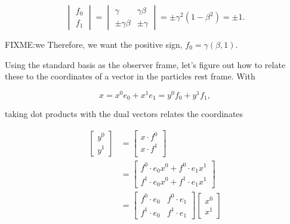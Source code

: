 \begin{equation}\label{eqn:grahamSchmidtLorentz:685}
\begin{vmatrix}
f_0 \\
f_1
\end{vmatrix}
=
\begin{vmatrix}
\gamma & \gamma \beta \\
\pm \gamma \beta & \pm \gamma
\end{vmatrix}
=
\pm \gamma^2 ( 1 - \beta^2)
= \pm 1.
\end{equation}

FIXME:we
Therefore, we want the positive sign, $f_0 = \gamma (\beta, 1)$.

Using the standard basis as the observer frame, let's figure out how to relate these to the coordinates of a vector in the particles rest frame.  With

\begin{equation}\label{eqn:grahamSchmidtLorentz:700}
x = x^0 e_0 + x^1 e_1 = y^0 f_0 + y^1 f_1,
\end{equation}

taking dot products with the dual vectors relates the coordinates

\begin{equation}\label{eqn:grahamSchmidtLorentz:720}
\begin{aligned}
\begin{bmatrix}
y^0 \\
y^1
\end{bmatrix}
&=
\begin{bmatrix}
x \cdot f^0 \\
x \cdot f^1 \\
\end{bmatrix} \\
&=
\begin{bmatrix}
f^0 \cdot e_0
x^0
+
f^0 \cdot e_1
x^1
\\
f^1 \cdot e_0
x^0
+
f^1 \cdot e_1
x^1
\end{bmatrix} \\
&=
\begin{bmatrix}
f^0 \cdot e_0
&
f^0 \cdot e_1
\\
f^1 \cdot e_0
 &
f^1 \cdot e_1
\end{bmatrix}
\begin{bmatrix}
x^0 \\
x^1
\end{bmatrix}
\end{aligned}
\end{equation}

